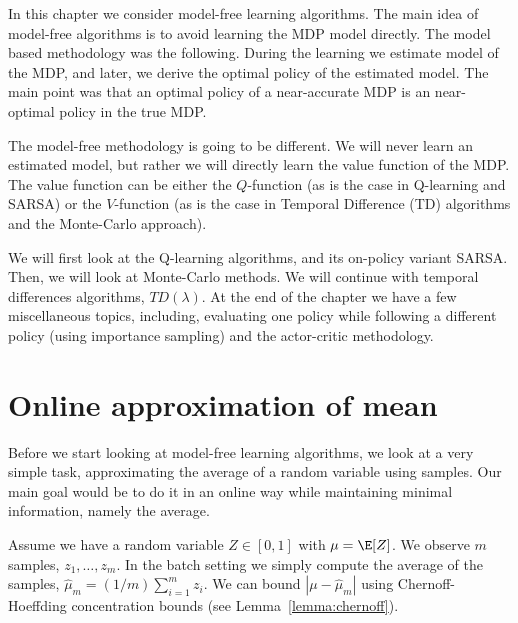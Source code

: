 In this chapter we consider model-free learning algorithms. The main
idea of model-free algorithms is to avoid learning the MDP model
directly. The model based methodology was the following. During the
learning we estimate model of the MDP, and later,  we derive the
optimal policy of the estimated model. The main point was that an
optimal policy of a near-accurate MDP is an near-optimal policy in
the true MDP.

The model-free methodology is going to be different. We will never
learn an estimated model, but rather we will directly learn the
value function of the MDP. The value function can be either the
$Q$-function (as is the case in Q-learning and SARSA) or the
$V$-function (as is the case in Temporal Difference (TD) algorithms
and the Monte-Carlo approach).

We will first look at the Q-learning algorithms, and its on-policy
variant SARSA. Then, we will look at Monte-Carlo methods. We will
continue with temporal differences algorithms, $TD(\lambda)$. At the
end of the chapter we have a few miscellaneous topics, including,
evaluating one policy while following a different policy (using
importance sampling) and the actor-critic methodology.



\section{Online approximation of mean}

Before we start looking at model-free learning algorithms, we look
at a very simple task, approximating the average of a random
variable using samples. Our main goal would be to do it in an online
way while maintaining minimal information, namely the average.

Assume we have a random variable $Z\in [0,1]$ with $\mu=\E[Z]$. We
observe $m$ samples, $z_1, \ldots , z_m$. In the batch setting we
simply compute the average of the samples,
$\widehat{\mu}_m=(1/m)\sum_{i=1}^m z_i$. We can bound
$|\mu-\widehat{\mu}_m|$ using Chernoff-Hoeffding concentration
bounds (see Lemma~\ref{lemma:chernoff}).

